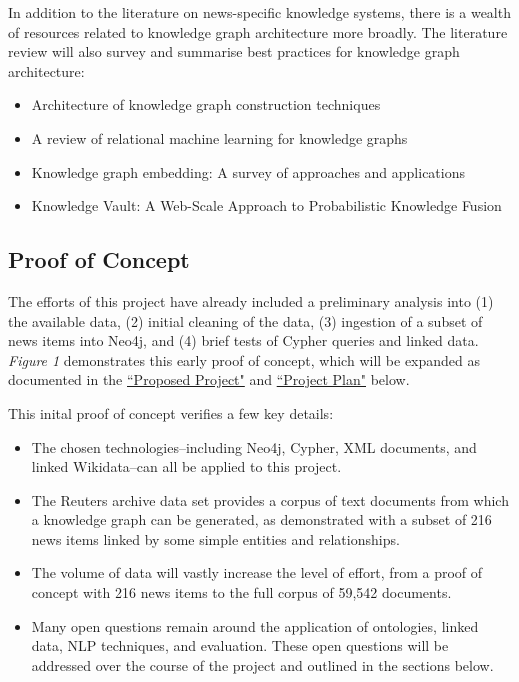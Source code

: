 \documentclass[11pt]{article}
\begin{document}
In addition to the literature on news-specific knowledge systems, there is a wealth of resources related to knowledge graph architecture more broadly. The literature review will also survey and summarise best practices for knowledge graph architecture:

\begin{itemize}
\item Architecture of knowledge graph construction techniques \cite{zhao2018architecture}
\item A review of relational machine learning for knowledge graphs \cite{nickel2015review}
\item Knowledge graph embedding: A survey of approaches and applications \cite{wang2017knowledge}
\item Knowledge Vault: A Web-Scale Approach to Probabilistic Knowledge Fusion \cite{45634}
\end{itemize}

\subsection{Proof of Concept}
The efforts of this project have already included a preliminary analysis into (1) the available data, (2) initial cleaning of the data, (3) ingestion of a subset of news items into Neo4j, and (4) brief tests of Cypher queries and linked data. \textit{Figure 1} demonstrates this early proof of concept, which will be expanded as documented in the \hyperref[sec:ProposedProject]{``Proposed Project"} and \hyperref[sec:ProjectPlan]{``Project Plan"} below.

This inital proof of concept verifies a few key details:

\begin{itemize}
  \item The chosen technologies--including Neo4j, Cypher, XML documents, and linked Wikidata--can all be applied to this project.
  \item The Reuters archive data set provides a corpus of text documents from which a knowledge graph can be generated, as demonstrated with a subset of 216 news items linked by some simple entities and relationships.
  \item The volume of data will vastly increase the level of effort, from a proof of concept with 216 news items to the full corpus of 59,542 documents.
  \item Many open questions remain around the application of ontologies, linked data, NLP techniques, and evaluation. These open questions will be addressed over the course of the project and outlined in the sections below.
\end{itemize}
\end{document}
